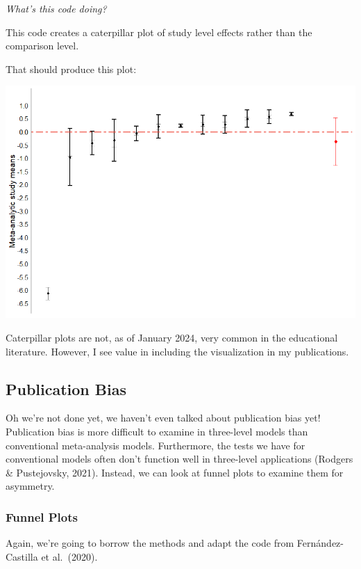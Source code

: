 \documentclass[
]{book}
\begin{document}
\emph{What's this code doing?}

This code creates a caterpillar plot of study level effects rather than the comparison level.

That should produce this plot:

\includegraphics[width=1\textwidth,height=\textheight]{images/caterpillar_study.png}

Caterpillar plots are not, as of January 2024, very common in the educational literature. However, I see value in including the visualization in my publications.

\hypertarget{publication-bias-1}{%
\subsection{Publication Bias}\label{publication-bias-1}}

Oh we're not done yet, we haven't even talked about publication bias yet! Publication bias is more difficult to examine in three-level models than conventional meta-analysis models. Furthermore, the tests we have for conventional models often don't function well in three-level applications (Rodgers \& Pustejovsky, 2021)\citep{rodgers2021}. Instead, we can look at funnel plots to examine them for asymmetry.

\hypertarget{funnel-plots}{%
\subsubsection{Funnel Plots}\label{funnel-plots}}

Again, we're going to borrow the methods and adapt the code from Fernández-Castilla et al.~(2020)\citep{fernández-castilla2020}.
\end{document}
